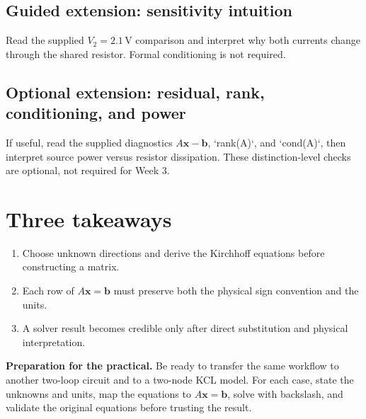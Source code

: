 \documentclass[11pt,a4paper]{article}
\newcommand{\units}[1]{\,\mathrm{#1}}
\begin{document}
\subsection*{Guided extension: sensitivity intuition}
Read the supplied $V_2=2.1\units{V}$ comparison and interpret why both currents change through the shared resistor. Formal conditioning is not required.

\subsection*{Optional extension: residual, rank, conditioning, and power}
If useful, read the supplied diagnostics $A\mathbf x-\mathbf b$, `rank(A)`, and `cond(A)`, then interpret source power versus resistor dissipation. These distinction-level checks are optional, not required for Week 3.

\section*{Three takeaways}
\begin{enumerate}[nosep,leftmargin=6mm]
\item Choose unknown directions and derive the Kirchhoff equations before constructing a matrix.
\item Each row of $A\mathbf x=\mathbf b$ must preserve both the physical sign convention and the units.
\item A solver result becomes credible only after direct substitution and physical interpretation.
\end{enumerate}

\begin{keybox}\textbf{Preparation for the practical.} Be ready to transfer the same workflow to another two-loop circuit and to a two-node KCL model. For each case, state the unknowns and units, map the equations to $A\mathbf x=\mathbf b$, solve with backslash, and validate the original equations before trusting the result.\end{keybox}
\end{document}
